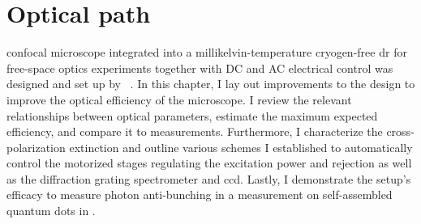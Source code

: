 \chapter{Optical path}\label{ch:setup:optics}
 confocal microscope integrated into a millikelvin-temperature cryogen-free \gls{dr} for free-space optics experiments together with DC and AC electrical control was designed and set up by \citeauthor{Descamps2024}~\cite{Descamps2021,Descamps2024}.
In this chapter, I lay out improvements to the design to improve the optical efficiency of the microscope.
I review the relevant relationships between optical parameters, estimate the maximum expected efficiency, and compare it to measurements.
Furthermore, I characterize the cross-polarization extinction and outline various schemes I established to automatically control the motorized stages regulating the excitation power and rejection as well as the diffraction grating spectrometer and \gls{ccd}.
Lastly, I demonstrate the setup's efficacy to measure photon anti-bunching in a  measurement on self-assembled quantum dots in .

\begin{marginfigure}[*-8]
    
    \caption[]{
        Reduced sketch of the microscope optical path.
        A Gaussian beam is launched from a \gls{smf} and collimated by the excitation ocular (E).
        It is polarized (P), passes \halfwave- and \quarterwave-plates, and is reflected into the cryostat by a 90:10 \acrfull{bs}.
        An objective lens (O) focuses the beam onto the sample and collects and collimates the emitted light.
        It exits the cryostat, is transmitted through the \gls{bs} and an analyzer (A) before being focused into the \gls{smf} by the detection ocular (D).
        Another \halfwave-plate can be inserted below the analyzer to rotate the plane of polarization, and another beam splitter can be inserted below the first to divert some of the light to a \acrshort{cmos} camera with ocular lens (C).
        Not shown is the cold mirror that deflects the collimated beam before the objective lens.
    }
    \label{fig:setup:optics:optical_path}
\end{marginfigure}


